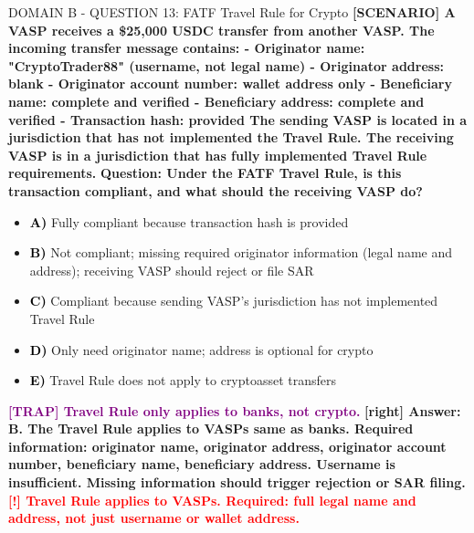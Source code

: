 \documentclass[11pt,a4paper]{beamer}
\newcommand{\redflag}[1]{\textcolor{red}{\textbf{[!] #1}}}
\newcommand{\trap}[1]{\textcolor{purple}{\textbf{[TRAP] #1}}}
\newcommand{\correct}[1]{\textcolor{green!50!black}{\textbf{[right] #1}}}
\newcommand{\scenario}[1]{\textcolor{blue!70!black}{\textbf{[SCENARIO] #1}}}
\newcommand{\option}[1]{\textcolor{black}{\textbf{#1}}}
\begin{document}
\begin{frame}{DOMAIN B - QUESTION 13: FATF Travel Rule for Crypto}
\scenario{A VASP receives a \$25,000 USDC transfer from another VASP. The incoming transfer message contains:
- Originator name: "CryptoTrader88" (username, not legal name)
- Originator address: blank
- Originator account number: wallet address only
- Beneficiary name: complete and verified
- Beneficiary address: complete and verified
- Transaction hash: provided
The sending VASP is located in a jurisdiction that has not implemented the Travel Rule. The receiving VASP is in a jurisdiction that has fully implemented Travel Rule requirements.}
\vspace{0.2cm}
\textbf{Question: Under the FATF Travel Rule, is this transaction compliant, and what should the receiving VASP do?}
\vspace{0.1cm}
\begin{itemize}
    \item \option{A)} Fully compliant because transaction hash is provided
    \item \option{B)} Not compliant; missing required originator information (legal name and address); receiving VASP should reject or file SAR
    \item \option{C)} Compliant because sending VASP's jurisdiction has not implemented Travel Rule
    \item \option{D)} Only need originator name; address is optional for crypto
    \item \option{E)} Travel Rule does not apply to cryptoasset transfers
\end{itemize}
\vspace{0.2cm}
\trap{Travel Rule only applies to banks, not crypto.}
\correct{Answer: B. The Travel Rule applies to VASPs same as banks. Required information: originator name, originator address, originator account number, beneficiary name, beneficiary address. Username is insufficient. Missing information should trigger rejection or SAR filing.}
\redflag{Travel Rule applies to VASPs. Required: full legal name and address, not just username or wallet address.}
\end{frame}
\end{document}
